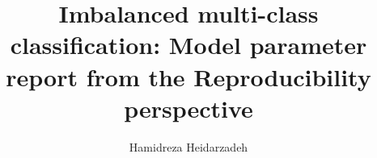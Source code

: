 \author{Hamidreza Heidarzadeh}
\title{Imbalanced multi-class classification: Model parameter report from the Reproducibility perspective}

